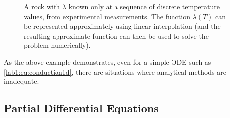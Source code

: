 \begin{example}
\begin{figure}[htbp]
    \caption{A rock with $\lambda$ known only at a sequence of
      discrete temperature values, from experimental measurements.
      The function $\lambda(T)$  can be 
      represented approximately using linear interpolation (and the
      resulting approximate function can then be used to solve the
      problem numerically).}
    \label{lab1:fig:table}
  \end{figure}
\end{example}

As the above example demonstrates, even for a simple ODE such as
\eqref{lab1:eq:conduction1d}, there 
are situations where analytical methods are inadequate.  

\subsection{Partial Differential Equations}

